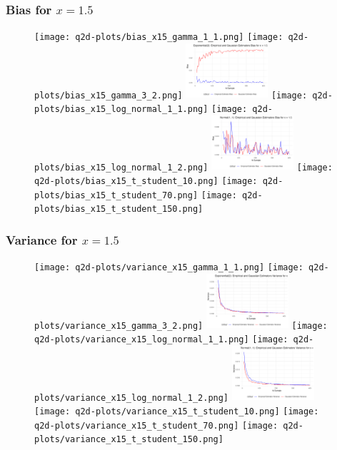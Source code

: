 \documentclass{article}
\begin{document}
{\subsubsection*{Bias for $x = 1.5$}

\begin{figure}[H]
  \centering
  \texttt{[image: q2d-plots/bias\_x15\_gamma\_1\_1.png]}
  \texttt{[image: q2d-plots/bias\_x15\_gamma\_3\_2.png]}
  \includegraphics[width=115px]{q2d-plots/bias_x15_exponential.png}
  \texttt{[image: q2d-plots/bias\_x15\_log\_normal\_1\_1.png]}
  \texttt{[image: q2d-plots/bias\_x15\_log\_normal\_1\_2.png]}
  \includegraphics[width=115px]{q2d-plots/bias_x15_normal.png}
  \texttt{[image: q2d-plots/bias\_x15\_t\_student\_10.png]}
  \texttt{[image: q2d-plots/bias\_x15\_t\_student\_70.png]}
  \texttt{[image: q2d-plots/bias\_x15\_t\_student\_150.png]}
  \label{fig:bias_x15}
\end{figure}

\subsubsection*{Variance for $x = 1.5$}

\begin{figure}[H]
  \centering
  \texttt{[image: q2d-plots/variance\_x15\_gamma\_1\_1.png]}
  \texttt{[image: q2d-plots/variance\_x15\_gamma\_3\_2.png]}
  \includegraphics[width=115px]{q2d-plots/variance_x15_exponential.png}
  \texttt{[image: q2d-plots/variance\_x15\_log\_normal\_1\_1.png]}
  \texttt{[image: q2d-plots/variance\_x15\_log\_normal\_1\_2.png]}
  \includegraphics[width=115px]{q2d-plots/variance_x15_normal.png}
  \texttt{[image: q2d-plots/variance\_x15\_t\_student\_10.png]}
  \texttt{[image: q2d-plots/variance\_x15\_t\_student\_70.png]}
  \texttt{[image: q2d-plots/variance\_x15\_t\_student\_150.png]}
  \label{fig:variance_x15}
\end{figure}

}
\end{document}
